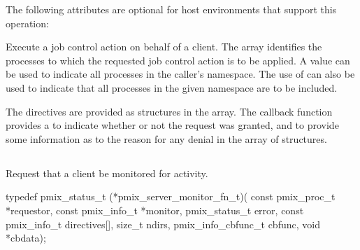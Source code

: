 \reqattrend

\optattrstart
The following attributes are optional for host environments that support this operation:


\optattrend

\descr

Execute a job control action on behalf of a client. The  array identifies the processes to which the requested job control action is to be applied.
A  value can be used to indicate all processes in the caller's namespace.
The use of  can also be used to indicate that all processes in the given namespace are to be included.

The directives are provided as  structures in the  array.
The callback function provides a  to indicate whether or not the request was granted, and to provide some information as to the reason for any denial in the  array of  structures.


\subsection{}

\summary

Request that a client be monitored for activity.

\format

\cspecificstart
\begin{codepar}
typedef pmix_status_t (*pmix_server_monitor_fn_t)(
                             const pmix_proc_t *requestor,
                             const pmix_info_t *monitor, pmix_status_t error,
                             const pmix_info_t directives[], size_t ndirs,
                             pmix_info_cbfunc_t cbfunc, void *cbdata);
\end{codepar}
\cspecificend

